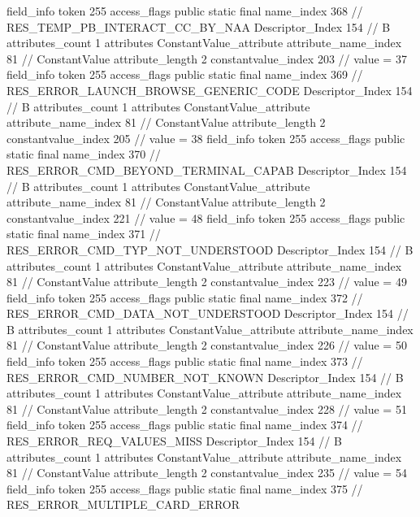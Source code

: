 {{{{{{{				}
				}
			}
			field_info {
				token	255
				access_flags	public static final
				name_index	368		// RES_TEMP_PB_INTERACT_CC_BY_NAA
				Descriptor_Index	154		// B
				attributes_count	1
				attributes {
				ConstantValue_attribute {
					attribute_name_index	81		// ConstantValue
					attribute_length	2
					constantvalue_index	203		// value = 37
				}
				}
			}
			field_info {
				token	255
				access_flags	public static final
				name_index	369		// RES_ERROR_LAUNCH_BROWSE_GENERIC_CODE
				Descriptor_Index	154		// B
				attributes_count	1
				attributes {
				ConstantValue_attribute {
					attribute_name_index	81		// ConstantValue
					attribute_length	2
					constantvalue_index	205		// value = 38
				}
				}
			}
			field_info {
				token	255
				access_flags	public static final
				name_index	370		// RES_ERROR_CMD_BEYOND_TERMINAL_CAPAB
				Descriptor_Index	154		// B
				attributes_count	1
				attributes {
				ConstantValue_attribute {
					attribute_name_index	81		// ConstantValue
					attribute_length	2
					constantvalue_index	221		// value = 48
				}
				}
			}
			field_info {
				token	255
				access_flags	public static final
				name_index	371		// RES_ERROR_CMD_TYP_NOT_UNDERSTOOD
				Descriptor_Index	154		// B
				attributes_count	1
				attributes {
				ConstantValue_attribute {
					attribute_name_index	81		// ConstantValue
					attribute_length	2
					constantvalue_index	223		// value = 49
				}
				}
			}
			field_info {
				token	255
				access_flags	public static final
				name_index	372		// RES_ERROR_CMD_DATA_NOT_UNDERSTOOD
				Descriptor_Index	154		// B
				attributes_count	1
				attributes {
				ConstantValue_attribute {
					attribute_name_index	81		// ConstantValue
					attribute_length	2
					constantvalue_index	226		// value = 50
				}
				}
			}
			field_info {
				token	255
				access_flags	public static final
				name_index	373		// RES_ERROR_CMD_NUMBER_NOT_KNOWN
				Descriptor_Index	154		// B
				attributes_count	1
				attributes {
				ConstantValue_attribute {
					attribute_name_index	81		// ConstantValue
					attribute_length	2
					constantvalue_index	228		// value = 51
				}
				}
			}
			field_info {
				token	255
				access_flags	public static final
				name_index	374		// RES_ERROR_REQ_VALUES_MISS
				Descriptor_Index	154		// B
				attributes_count	1
				attributes {
				ConstantValue_attribute {
					attribute_name_index	81		// ConstantValue
					attribute_length	2
					constantvalue_index	235		// value = 54
				}
				}
			}
			field_info {
				token	255
				access_flags	public static final
				name_index	375		// RES_ERROR_MULTIPLE_CARD_ERROR
}}}}}
